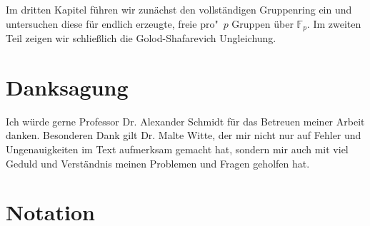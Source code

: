 \documentclass[11pt,a4paper,openany]{memoir}
\begin{document}
Im dritten Kapitel führen wir zunächst den vollständigen Gruppenring ein und untersuchen diese für endlich erzeugte, freie pro"~$p$ Gruppen über $\mathbb{F}_p$. Im zweiten Teil zeigen wir schließlich die Golod-Shafarevich Ungleichung.

\section{Danksagung}

Ich würde gerne Professor Dr. Alexander Schmidt für das Betreuen meiner Arbeit danken. Besonderen Dank gilt Dr. Malte Witte, der mir nicht nur auf Fehler und Ungenauigkeiten im Text aufmerksam gemacht hat, sondern mir auch mit viel Geduld und Verständnis meinen Problemen und Fragen geholfen hat.

\clearpage

\section{Notation}
\end{document}
